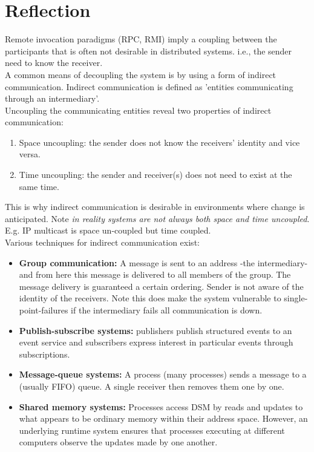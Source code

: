 \section{Reflection}
\label{jgroup_motivation}
Remote invocation paradigms (RPC, RMI) imply a coupling between the participants that is often not desirable in distributed systems. i.e., the sender need to know the receiver. \\

A common means of decoupling the system is by using a form of indirect communication. Indirect communication is defined as 'entities communicating through an intermediary'.\\
 
Uncoupling the communicating entities reveal two properties of indirect communication: 

\begin{enumerate}
\item Space uncoupling: the sender does not know the receivers' identity and vice versa. 
\item Time uncoupling: the sender and receiver(s) does not need to exist at the same time.  
\end{enumerate}

This is why indirect communication is desirable in environments where change is anticipated. Note \textit{in reality systems are not always both space and time uncoupled}. E.g. IP multicast is space un-coupled but time coupled. \\

Various techniques for indirect communication exist:\\

\begin{itemize}
\item \textbf{Group communication:} A message is sent to an address -the intermediary-  and from here this message is delivered to all members of the group. The message delivery is guaranteed a certain ordering. Sender is not aware of the identity of the receivers. Note this does make the system vulnerable to single-point-failures if the intermediary fails all communication is down. \\

\item \textbf{Publish-subscribe systems:} publishers publish structured events to an event service and subscribers express interest in particular events through  subscriptions. \\

\item \textbf{Message-queue systems:} A process (many processes) sends a message to a (usually FIFO) queue. A single receiver then removes them one by one.\\

\item \textbf{Shared memory systems:} Processes access DSM by reads and updates to what appears to be ordinary memory within their address space. However, an underlying runtime system ensures that processes executing at different computers observe the updates made by one another.\\
\end{itemize}

